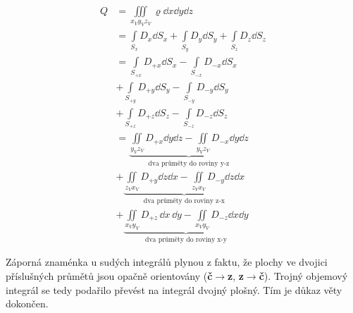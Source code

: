      \begin{align*}
        Q &= \iiint\limits_{x_Vy_Vz_V}\varrho\dd{x}\dd{y}\dd{z}                  \\
          &= \int\limits_{S_x}D_x\dd{S_x} + 
             \int\limits_{S_y}D_y\dd{S_y} + 
             \int\limits_{S_z}D_z\dd{S_z}                                                  \\
          &= \int\limits_{S_{+x}}D_{+x}\dd{S_x} - \int\limits_{S_{-x}}D_{-x}\dd{S_x}       \\
          &+ \int\limits_{S_{+y}}D_{+y}\dd{S_y} - \int\limits_{S_{-y}}D_{-y}\dd{S_y}       \\
          &+ \int\limits_{S_{+z}}D_{+z}\dd{S_z} - \int\limits_{S_{-z}}D_{-z}\dd{S_z}       \\
          &= \underbrace{\iint\limits_{y_Vz_V}D_{+x}\dd{y}\dd{z} 
           - \iint\limits_{y_Vz_V}D_{-x}\dd{y}\dd{z}}_{\text{dva průměty do roviny y-z}}   \\
          &+ \underbrace{\iint\limits_{z_Vx_V}D_{+y}\dd{z}\dd{x} 
           - \iint\limits_{z_Vx_V}D_{-y}\dd{z}\dd{x}}_{\text{dva průměty do roviny z-x}}   \\
          &+ \underbrace{\iint\limits_{x_Vy_V}D_{+z}\,\dd{x}\,\dd{y} 
           - \iint\limits_{x_Vy_V}D_{-z}\dd{x}\dd{y}}_{\text{dva průměty do roviny x-y}}
      \end{align*}

      Záporná znaménka u sudých integrálů plynou z faktu, že plochy ve dvojici příslušných průmětů 
      jsou opačně orientovány (\textbf{č}\(\rightarrow\)\textbf{z}, 
      \textbf{z}\(\rightarrow\)\textbf{č}). Trojný objemový integrál se tedy podařilo převést 
      na integrál dvojný plošný. Tím je důkaz věty dokončen.
      

